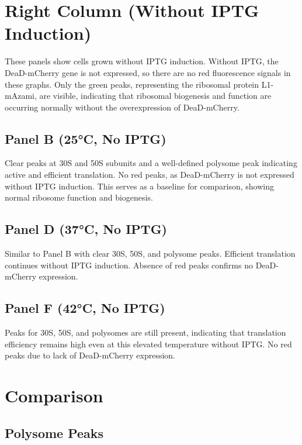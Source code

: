\documentclass[12pt]{article}
\begin{document}
\section{Right Column (Without IPTG Induction)}

These panels show cells grown without IPTG induction.
Without IPTG, the DeaD-mCherry gene is not expressed, so there are no red fluorescence signals in these graphs. Only the green peaks, representing the ribosomal protein L1-mAzami, are visible, indicating that ribosomal biogenesis and function are occurring normally without the overexpression of DeaD-mCherry.

\subsection{Panel B (25°C, No IPTG)}


Clear peaks at 30S and 50S subunits and a well-defined polysome peak indicating active and efficient translation. No red peaks, as DeaD-mCherry is not expressed without IPTG induction. This serves as a baseline for comparison, showing normal ribosome function and biogenesis.

 
\subsection{Panel D (37°C, No IPTG)}


Similar to Panel B with clear 30S, 50S, and polysome peaks. Efficient translation continues without IPTG induction. Absence of red peaks confirms no DeaD-mCherry expression.

    
\subsection{Panel F (42°C, No IPTG)}

Peaks for 30S, 50S, and polysomes are still present, indicating that translation efficiency remains high even at this elevated temperature without IPTG. No red peaks due to lack of DeaD-mCherry expression.


\section{Comparison}

\subsection{Polysome Peaks}
\end{document}
